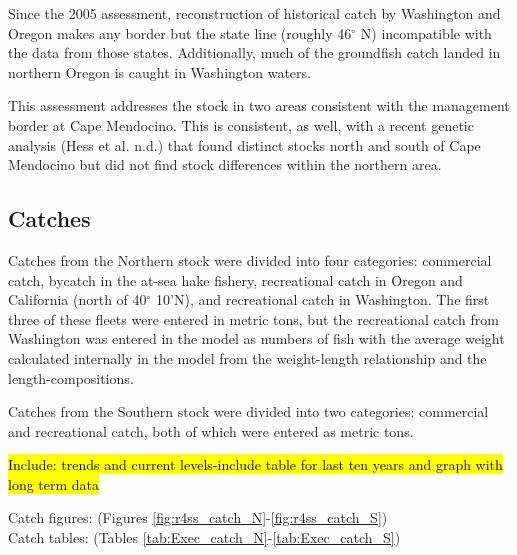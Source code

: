 \documentclass[12pt,]{article}
\begin{document}
Since the 2005 assessment, reconstruction of historical catch by
Washington and Oregon makes any border but the state line (roughly
46\(^\circ\) N) incompatible with the data from those states.
Additionally, much of the groundfish catch landed in northern Oregon is
caught in Washington waters.

This assessment addresses the stock in two areas consistent with the
management border at Cape Mendocino. This is consistent, as well, with a
recent genetic analysis (Hess et al. n.d.) that found distinct stocks
north and south of Cape Mendocino but did not find stock differences
within the northern area.

\subsection*{Catches}\label{catches}

Catches from the Northern stock were divided into four categories:
commercial catch, bycatch in the at-sea hake fishery, recreational catch
in Oregon and California (north of 40\(^\circ\) 10'N), and recreational
catch in Washington. The first three of these fleets were entered in
metric tons, but the recreational catch from Washington was entered in
the model as numbers of fish with the average weight calculated
internally in the model from the weight-length relationship and the
length-compositions.

Catches from the Southern stock were divided into two categories:
commercial and recreational catch, both of which were entered as metric
tons.

\hl{Include: trends and current levels-include table for last ten years and graph with 
long term data}

Catch figures: (Figures \ref{fig:r4ss_catch_N}-\ref{fig:r4ss_catch_S})\\
Catch tables: (Tables \ref{tab:Exec_catch_N}-\ref{tab:Exec_catch_S})

\FloatBarrier

\FloatBarrier
\end{document}
